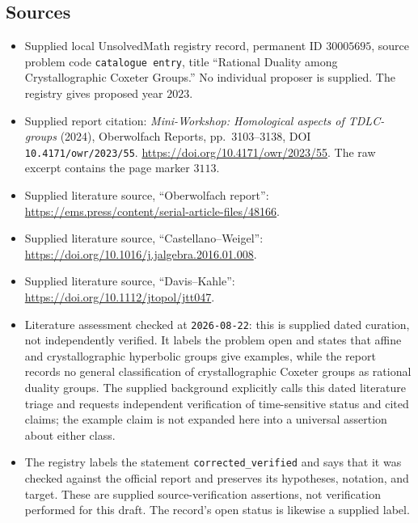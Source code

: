 \documentclass[11pt]{article}
\begin{document}
\subsection{Sources}
\begin{itemize}
\item Supplied local UnsolvedMath registry record, permanent ID \(30005695\), source problem code \texttt{catalogue entry}, title ``Rational Duality among Crystallographic Coxeter Groups.'' No individual proposer is supplied. The registry gives proposed year \(2023\).
\item Supplied report citation: \emph{Mini-Workshop: Homological aspects of TDLC-groups} (2024), Oberwolfach Reports, pp.~3103--3138, DOI \texttt{10.4171/owr/2023/55}. \url{https://doi.org/10.4171/owr/2023/55}. The raw excerpt contains the page marker \(3113\).
\item Supplied literature source, ``Oberwolfach report'': \url{https://ems.press/content/serial-article-files/48166}.
\item Supplied literature source, ``Castellano--Weigel'': \url{https://doi.org/10.1016/j.jalgebra.2016.01.008}.
\item Supplied literature source, ``Davis--Kahle'': \url{https://doi.org/10.1112/jtopol/jtt047}.
\item Literature assessment checked at \texttt{2026-08-22}: this is supplied dated curation, not independently verified. It labels the problem open and states that affine and crystallographic hyperbolic groups give examples, while the report records no general classification of crystallographic Coxeter groups as rational duality groups. The supplied background explicitly calls this dated literature triage and requests independent verification of time-sensitive status and cited claims; the example claim is not expanded here into a universal assertion about either class.
\item The registry labels the statement \texttt{corrected\_verified} and says that it was checked against the official report and preserves its hypotheses, notation, and target. These are supplied source-verification assertions, not verification performed for this draft. The record's open status is likewise a supplied label.
\end{itemize}
\end{document}
